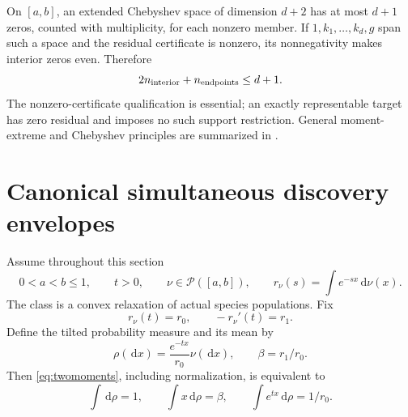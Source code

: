 \documentclass[11pt]{article}
\numberwithin{equation}{section}
\theoremstyle{definition}
\theoremstyle{remark}
\newcommand{\Prob}{\mathcal P}
\newcommand{\dd}{\,\mathrm d}
\begin{document}
On $[a,b]$, an extended Chebyshev space of dimension $d+2$ has at most $d+1$ zeros, counted with multiplicity, for each nonzero member. If $1,k_1,\ldots,k_d,g$ span such a space and the residual certificate is nonzero, its nonnegativity makes interior zeros even. Therefore
\begin{equation}\label{eq:contactcount}
 2n_{\rm interior}+n_{\rm endpoints}\le d+1.
\end{equation}
The nonzero-certificate qualification is essential; an exactly representable target has zero residual and imposes no such support restriction. General moment-extreme and Chebyshev principles are summarized in \cite{Pinelis2011}.

\section{Canonical simultaneous discovery envelopes}\label{sec:envelopes}
Assume throughout this section
\[
 0<a<b\le1,\qquad t>0,\qquad \nu\in\Prob([a,b]),\qquad
 r_\nu(s)=\int e^{-sx}\dd\nu(x).
\]
The class is a convex relaxation of actual species populations. Fix
\begin{equation}\label{eq:twomoments}
 r_\nu(t)=r_0,\qquad -r_\nu'(t)=r_1.
\end{equation}
Define the tilted probability measure and its mean by
\[
 \rho(\dd x)=\frac{e^{-tx}}{r_0}\nu(\dd x),\qquad \beta=r_1/r_0.
\]
Then \eqref{eq:twomoments}, including normalization, is equivalent to
\begin{equation}\label{eq:tiltmoments}
 \int\dd\rho=1,\qquad \int x\dd\rho=\beta,
 \qquad \int e^{tx}\dd\rho=1/r_0.
\end{equation}
\end{document}
